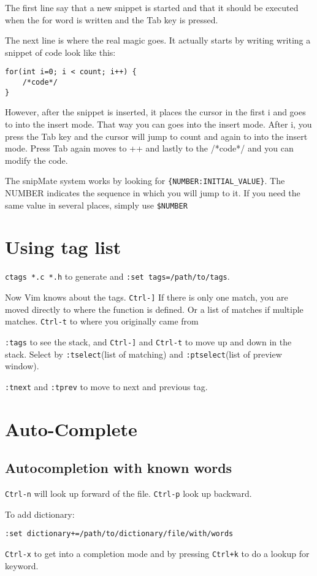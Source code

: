 \documentclass[11pt]{book}
\begin{document}
The first line say that a new snippet is started and that it should be executed
when the for word is written and the Tab key is pressed.

The next line is where the real magic goes. It actually starts by writing
writing a snippet of code look like this:
\begin{verbatim}
for(int i=0; i < count; i++) {
    /*code*/
}
\end{verbatim}

However, after the snippet is inserted, it places the cursor in the first i and
goes to into the insert mode. That way you can goes into the insert mode. After
i, you press the Tab key and the cursor will jump to count and again to into the
insert mode. Press Tab again moves to ++ and lastly to the /*code*/ and you can
modify the code.

The snipMate system works by looking for \verb|{NUMBER:INITIAL_VALUE}|. The
NUMBER indicates the sequence in which you will jump to it. If you need the same
value in several places, simply use \verb|$NUMBER|

\section{Using tag list}
\verb|ctags *.c *.h| to generate and \verb|:set tags=/path/to/tags|.

Now Vim knows about the tags. \verb|Ctrl-]| If there is only one match, you are
moved directly to where the function is defined. Or a list of matches if
multiple matches. \verb|Ctrl-t| to where you originally came from

\verb|:tags| to see the stack, and \verb|Ctrl-]| and \verb|Ctrl-t| to move up
and down in the stack. Select by \verb|:tselect|(list of matching) and
\verb|:ptselect|(list of preview window).

\verb|:tnext| and \verb|:tprev| to move to next and previous tag.
\section{Auto-Complete}
\subsection{Autocompletion with known words}
\verb|Ctrl-n| will look up forward of the file. \verb|Ctrl-p| look up backward.

To add dictionary:
\begin{verbatim}
:set dictionary+=/path/to/dictionary/file/with/words
\end{verbatim}
\verb|Ctrl-x| to get into a completion mode and by pressing \verb|Ctrl+k| to do
a lookup for keyword.
\end{document}
